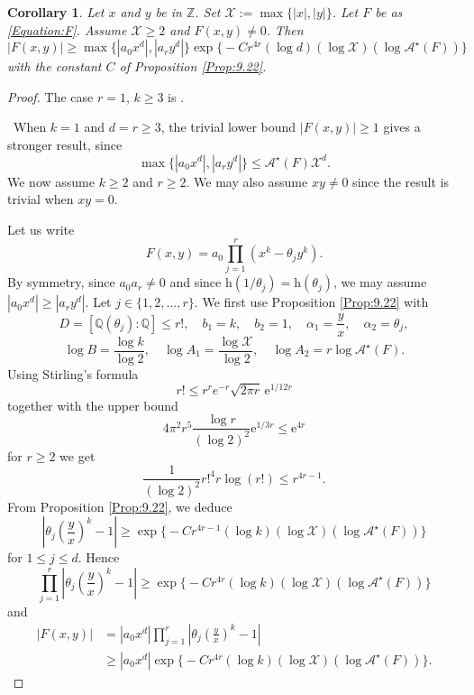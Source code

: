 \documentclass[10pt]{article}
\newtheorem{corollary}[theorem]{Corollary}
\theoremstyle{definition}
\numberwithin{equation}{section}
\newcommand {\Q}{{\mathbb{Q}}}
\newcommand {\Z}{{\mathbb{Z}}}
\newcommand{\rmh}{\mathrm {h}}
\newcommand{\rme}{\mathrm {e}}
\newcommand{\calA}{\mathcal {A}}
\newcommand{\calX}{\mathcal {X}}
\begin{document}
\begin{corollary}\label{Cor:H(xd,yd)}
Let $x$ and $y$ be in $\Z$. Set $\calX:=\max\{|x|,|y|\}$. Let $F$ be as \eqref{Equation:F}. 
Assume 
 $\calX\geqslant 2$ and
 $F(x,y)\not=0$. 
Then 
 \[ 
 |F(x,y)| 
 \ge
\max\{ |a_0x^{d}|, |a_r y^{d}| \} 
 \exp\big\{-C r^{4r} (\log d)(\log \calX)(\log \calA^\star(F))\big\}
 \]
 with the constant $C$ of Proposition \ref{Prop:9.22}.
\end{corollary}

\begin{proof} 
The case $r=1$, $k\geqslant 3$ is \cite[Corollary 5.2]{FW2}.

\ 
When $k=1$ and $d=r\geqslant 3$, the trivial lower bound $|F(x,y)|\geqslant 1$ gives a stronger result, since 
\[
\max\{ |a_0x^{d}|, |a_r y^{d}| \}\leqslant \calA^\star(F) \calX^d. 
\]
We now assume $k\geqslant 2$ and $r\geqslant 2$. 
We may also assume $xy\not=0$ since the result is trivial when $xy=0$.

Let us write 
\[
F(x,y)=a_0 \prod_{j=1}^r(x^k-\theta_jy^k).
\]
By symmetry, since $a_0a_r\not=0$ and since $\rmh(1/\theta_j)=\rmh(\theta_j)$, we may assume $ |a_0x^{d}| \geqslant |a_r y^{d}|$. 
Let $j\in\{1,2,\dots,r\}$. We first use Proposition \ref{Prop:9.22} with 
\[
D=[\Q(\theta_j):\Q]\leqslant r!,\quad 
b_1=k,\quad b_2=1,\quad \alpha_1=\frac y x, \quad \alpha_2=\theta_j,
\]
\[
\log B= \frac{\log k}{\log 2}, 
 \quad
 \log A_1= \frac{\log\calX}{\log 2}, 
 \quad \log A_2= r\log\calA^\star(F).
\]
Using Stirling's formula \cite{Ro} 
\[
r!\leqslant r^r e^{-r} \sqrt{2\pi r} \, \rme^{1/12r}
\]
together with the upper bound 
\[
4\pi^2 r^5 \frac{\log r}{(\log 2)^2} \rme^{1/3r}\leqslant \rme^{4r}
\]
for $r\geqslant 2$ we get
\[
\frac 1 {(\log 2)^2} r!^4r\log(r!)\leqslant r^{4r-1}.
\]
From Proposition \ref{Prop:9.22}, we deduce
\[
\left| 
\theta_j\left ( \frac y x\right)^k -1\right| \geqslant 
 \exp\big\{-C r^{4r-1} (\log k)(\log \calX)(\log \calA^\star(F))\big\}
 \]
for $1\leqslant j\leqslant d$. Hence 
\[
\prod_{j=1}^r\left| 
\theta_j\left( \frac y x \right)^k -1\right| 
\geqslant 
 \exp\big\{-C r^{4r} (\log k)(\log \calX)(\log \calA^\star(F))\big\}
\]
and
\[
\begin{aligned}
|F(x,y)|
&=
|a_0x^{d} | \prod_{j=1}^r\left| 
\theta_j\left( \frac y x \right)^k -1\right| 
\\
& \ge
 |a_0x^{d}| \exp\big\{-C r^{4r} (\log k) (\log \calX)(\log \calA^\star(F))\big\}.
 \end{aligned}
\]
\end{proof}
\end{document}

